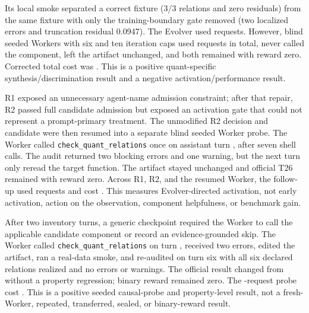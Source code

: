  Its
local smoke separated a correct fixture (3/3 relations and zero residuals) from
the same fixture with only the training-boundary gate removed (two localized
errors and truncation residual 0.0947). The Evolver used
\QDROneEvolverRequests{} requests. However, blind seeded Workers with six and
ten iteration caps used \QDROneWorkerRequests{} requests in total, never called
the component, left the artifact unchanged, and both remained
\QDROneScore{} with reward zero. Corrected total cost was \QDROneCost{}.
This is a positive quant-specific synthesis/discrimination result and a
negative activation/performance result.

 R1 exposed an
unnecessary agent-name admission constraint; after that repair, R2 passed full
candidate admission but exposed an activation gate that could not represent a
prompt-primary treatment. The unmodified R2 decision and candidate were then
resumed into a separate blind seeded Worker probe. The Worker called
\texttt{check\_quant\_relations} once on assistant turn
\QDRActivationFirstTurn{}, after seven shell calls. The audit returned two
blocking errors and one warning, but the next turn only reread the target
function. The artifact stayed unchanged and official T26 remained
\QDRActivationScore{} with reward zero. Across R1, R2, and the resumed Worker,
the follow-up used \QDRActivationRequests{} requests and cost
\QDRActivationCost{}. This measures Evolver-directed activation, not early
activation, action on the observation, component helpfulness, or benchmark gain.

 After two inventory turns, a
generic checkpoint required the Worker to call the applicable candidate
component or record an evidence-grounded skip. The Worker called
\texttt{check\_quant\_relations} on turn \QDRCausalProbeFirstTurn{}, received
two errors, edited the artifact, ran a real-data smoke, and re-audited on turn
six with all six declared relations realized and no errors or warnings. The
official result changed from \QDRCausalProbeScore{} without a property
regression; binary reward remained zero. The \QDRCausalProbeRequests{}-request
probe cost \QDRCausalProbeCost{}. This is a positive seeded causal-probe and
property-level result, not a fresh-Worker, repeated, transferred, sealed, or
binary-reward result.


